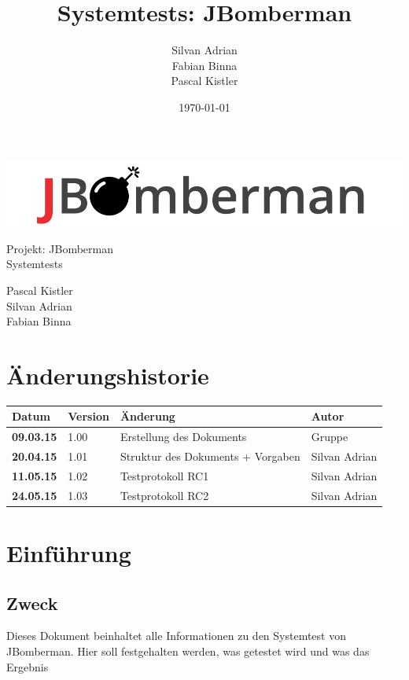 \documentclass[11pt]{scrartcl}
\title{Systemtests: JBomberman}
\author{Silvan Adrian \\ Fabian Binna \\ Pascal Kistler}
\date{\today{}}
\begin{document}
\def\arraystretch{1.5}
\begin{titlepage}
\begin{center}
\vspace{10em}
\includegraphics[scale=2]{jbomberman}
\vspace{10em}
\end{center}
\begin{center}
\huge {Projekt: JBomberman} \\
\huge {Systemtests}
\end{center}
\begin{center}
\vspace{10em}
\LARGE {Pascal Kistler} \\
\LARGE {Silvan Adrian} \\
\LARGE {Fabian Binna}
\end{center}

\end{titlepage}

\newpage
\section{Änderungshistorie}
\label{sec:Änderungen}

\begin{tabularx}{\linewidth}{l l l l}
\textbf{Datum} & \textbf{Version} & \textbf{Änderung}  & \textbf{Autor} \\
\hline
\textbf{09.03.15} & 1.00 & Erstellung des Dokuments & Gruppe \\
\textbf{20.04.15} & 1.01 & Struktur des Dokuments + Vorgaben & Silvan Adrian \\
\textbf{11.05.15} & 1.02 & Testprotokoll RC1 & Silvan Adrian \\
\textbf{24.05.15} & 1.03 & Testprotokoll RC2 & Silvan Adrian \\
\end{tabularx}

\newpage
\tableofcontents
\newpage
\section{Einführung}
\subsection{Zweck}
Dieses Dokument beinhaltet alle Informationen zu den Systemtest von JBomberman.
Hier soll festgehalten werden, was getestet wird und was das Ergebnis
\end{document}
